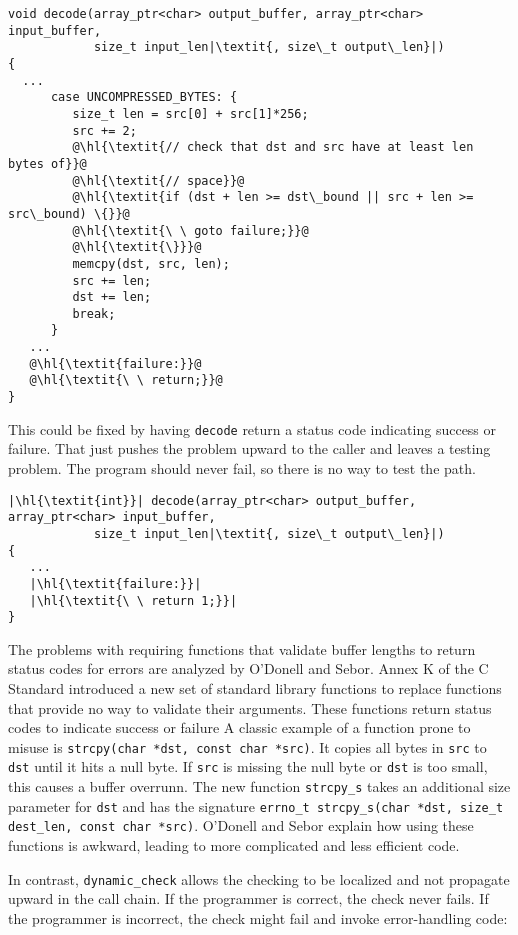 \begin{lstlisting}[escapechar=\@]
void decode(array_ptr<char> output_buffer, array_ptr<char> input_buffer,
            size_t input_len|\textit{, size\_t output\_len}|)
{
  ...
      case UNCOMPRESSED_BYTES: {
         size_t len = src[0] + src[1]*256;
         src += 2;
         @\hl{\textit{// check that dst and src have at least len bytes of}}@
         @\hl{\textit{// space}}@
         @\hl{\textit{if (dst + len >= dst\_bound || src + len >= src\_bound) \{}}@
         @\hl{\textit{\ \ goto failure;}}@
         @\hl{\textit{\}}}@
         memcpy(dst, src, len);
         src += len;
         dst += len;
         break;
      }
   ...
   @\hl{\textit{failure:}}@
   @\hl{\textit{\ \ return;}}@
}
\end{lstlisting}

This could be fixed by having \lstinline+decode+ return a status code
indicating success or failure. That just pushes the problem upward to
the caller and leaves a testing problem. The program should never fail,
so there is no way to test the path.

\begin{lstlisting}[escapechar=\|]
|\hl{\textit{int}}| decode(array_ptr<char> output_buffer, array_ptr<char> input_buffer,
            size_t input_len|\textit{, size\_t output\_len}|)
{
   ...
   |\hl{\textit{failure:}}|
   |\hl{\textit{\ \ return 1;}}|
}
\end{lstlisting}

The problems with requiring functions that validate buffer lengths to
return status codes for errors are analyzed by O'Donell and Sebor\cite{ODonell2015}. 
Annex K of the C Standard \cite{ISO2011} introduced a new set of standard library functions to replace
functions that provide no way to validate their arguments. These
functions return status codes to indicate success or failure A classic
example of a function prone to misuse is
\lstinline+strcpy(char *dst, const char *src)+.
It copies all bytes in \lstinline+src+ to \lstinline+dst+ until
it hits a null byte. If \lstinline+src+ is missing the null byte or
\lstinline+dst+ is too small, this causes a buffer overrunn. The new
function \lstinline+strcpy_s+ takes an additional size parameter for
\lstinline+dst+ and has the signature
\lstinline+errno_t strcpy_s(char *dst, size_t dest_len, const char *src)+.
O'Donell and Sebor explain how
using these functions is awkward, leading to more complicated and less
efficient code.

In contrast, \lstinline+dynamic_check+ allows the checking to be localized
and not propagate upward in the call chain. If the programmer is
correct, the check never fails. If the programmer is incorrect, the
check might fail and invoke error-handling code:

